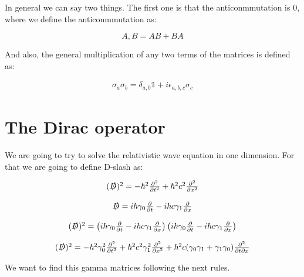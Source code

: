 In general we can say two things. The first one is that the anticonmmutation is 0, where we define the anticonmmutation as:

\begin{equation}
  {A,B} = AB+BA
\end{equation}

And also, the general multiplication of any two terms of the matrices is defined as:

\begin{equation}
\begin{array}{c}
  \sigma_a \sigma_b = \delta_{a,b}\mathbb{1} + i\epsilon_{a,b,c}\sigma_c
\end{array}
\end{equation}

\section{The Dirac operator}

We are going to try to solve the relativistic wave equation in one dimension. For that we are going to define D-slash as:

\begin{equation}
  \begin{array}{c}
    (\slashed{D})^2 = -\hbar^2 \frac{\partial^2}{\partial t^2} + \hbar^2 c^2 \frac{\partial^2}{\partial x^2}
    \\

    \\
    \slashed{D} = i\hbar\gamma_0 \frac{\partial}{\partial t}-i\hbar c \gamma_1 \frac{\partial}{\partial x}
    \\

    \\
    (\slashed{D})^2 = \left(i\hbar\gamma_0\frac{\partial}{\partial t}-i\hbar c\gamma_1\frac{\partial}{\partial x}\right)\left(i\hbar\gamma_0\frac{\partial}{\partial t}-i\hbar c\gamma_1\frac{\partial}{\partial x}\right)
    \\

    \\
    (\slashed{D})^2 = -\hbar^2 \gamma_0^2 \frac{\partial^2}{\partial t^2} + \hbar^2 c^2 \gamma_1^2 \frac{\partial^2}{\partial x^2} + \hbar^2 c (\gamma_0\gamma_1 + \gamma_1\gamma_0)\frac{\partial^2}{\partial t \partial x}
  \end{array}
\end{equation}

We want to find this  gamma matrices following the next rules.

